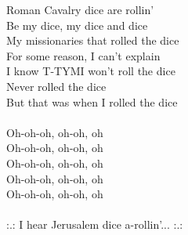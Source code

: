 Roman Cavalry dice are rollin’ \\
Be my dice, my dice and dice \\
My missionaries that rolled the dice \\
For some reason, I can't explain \\
I know T-TYMI won't roll the dice \\
Never rolled the dice \\
But that was when I rolled the dice \\
\hspace{10mm}\\
Oh-oh-oh, oh-oh, oh \\
Oh-oh-oh, oh-oh, oh \\
Oh-oh-oh, oh-oh, oh \\
Oh-oh-oh, oh-oh, oh \\
Oh-oh-oh, oh-oh, oh \\
\hspace{10mm}\\
:.: I hear Jerusalem dice a-rollin'... :.: \\
